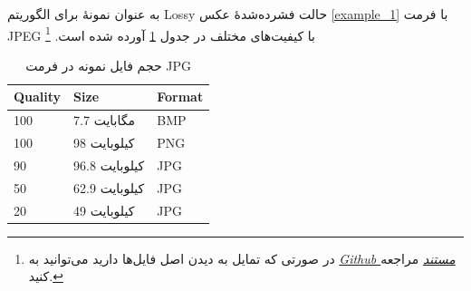 به عنوان نمونهٔ برای الگوریتم Lossy 
حالت فشرده‌شدهٔ عکس 
\ref{example_1}
با فرمت JPEG 
با کیفیت‌های مختلف در جدول 
\ref{compare_2}
آورده شده است.
\footnote{در صورتی که تمایل به دیدن اصل فایل‌ها دارید می‌توانید به 
\textit{  \href{https://github.com/merfanian/DataCompressionDoc/LatexFiles/figs/}{Github مستند} 
} 
مراجعه کنید.
} 

\begin{table}[h]
	\centering
	\caption{حجم فایل نمونه در فرمت JPG}
	\label{compare_2}
	\begin{tabular}{@{}lll@{}}
	\toprule
	Quality & Size & Format \\ \midrule
	100 & 7.7 مگابایت & BMP \\
	100 & 98 کیلوبایت & PNG \\
	90 & 96.8 کیلوبایت & JPG \\
	50 & 62.9 کیلوبایت & JPG \\
	20 & 49  کیلوبایت& JPG \\ \bottomrule
	\end{tabular}
	\end{table}



